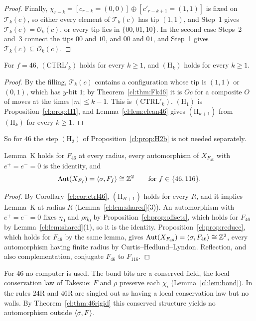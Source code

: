 \begin{proof}
Finally, $\chi_{r-k}=[c_{r-k}=(0,0)]\oplus[c'_{r-k+1}=(1,1)]$ is fixed on $\mathcal T_k(c)$, so either every element of $\mathcal T_k(c)$ has tip $(1,1)$, and Step~1 gives $\mathcal T_k(c)=\mathcal O_k(c)$, or every tip lies in $\{00,01,10\}$. In the second case Steps~2 and~3 connect the tips $00$ and $10$, and $00$ and $01$, and Step~1 gives $\mathcal T_k(c)\subseteq\mathcal O_k(c)$.
\end{proof}

\begin{corollary}\label{cl:cor:ctrl46}
For $f=46$, $(\mathrm{CTRL}'_k)$ holds for every $k\ge1$, and $(\mathrm H_k)$ holds for every $k\ge1$.
\end{corollary}

\begin{proof}
By the filling, $\mathcal T_k(c)$ contains a configuration whose tip is $(1,1)$ or $(0,1)$, which has $y$-bit $1$; by Theorem~\ref{cl:thm:Fk46} it is $Oc$ for a composite $O$ of moves at the times $|m|\le k-1$. This is $(\mathrm{CTRL}'_k)$. $(\mathrm H_1)$ is Proposition~\ref{cl:prop:H1}, and Lemma~\ref{cl:lem:clean46} gives $(\mathrm H_{k+1})$ from $(\mathrm H_k)$ for every $k\ge1$.
\end{proof}

So for $46$ the step $(\mathrm H_2)$ of Proposition~\ref{cl:prop:H2b} is not needed separately.

\begin{theorem}\label{cl:thm:46rigid}
Lemma~K holds for $F_{46}$ at every radius, every automorphism of $X_{F_{46}}$ with $e^+=e^-=0$ is the identity, and
\[
\operatorname{Aut}(X_{F_f})=\langle\sigma,F_f\rangle\cong\mathbb{Z}^2\qquad\text{for }f\in\{46,116\}.
\]
\end{theorem}

\begin{proof}
By Corollary~\ref{cl:cor:ctrl46}, $(\mathrm H_{R+1})$ holds for every $R$, and it implies Lemma~K at radius $R$ (Lemma~\ref{cl:lem:shared}(3)). An automorphism with $e^+=e^-=0$ fixes $\eta_0$ and $\rho\eta_0$ by Proposition~\ref{cl:prop:offsets}, which holds for $F_{46}$ by Lemma~\ref{cl:lem:shared}(1), so it is the identity. Proposition~\ref{cl:prop:reduce}, which holds for $F_{46}$ by the same lemma, gives $\operatorname{Aut}(X_{F_{46}})=\langle\sigma,F_{46}\rangle\cong\mathbb{Z}^2$, every automorphism having finite radius by Curtis--Hedlund--Lyndon. Reflection, and also complementation, conjugate $F_{46}$ to $F_{116}$.
\end{proof}

For $46$ no computer is used. The bond bits are a conserved field, the local conservation law of Takesue: $F$ and $\rho$ preserve each $\chi_i$ (Lemma~\ref{cl:lem:bond}). In \cite[p.~389]{Takesue1989} the rules $24$R and $46$R are singled out as having a local conservation law but no walls. By Theorem~\ref{cl:thm:46rigid} this conserved structure yields no automorphism outside $\langle\sigma,F\rangle$.

